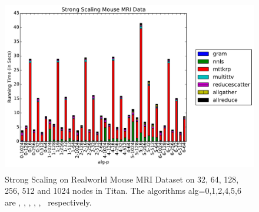 \begin{figure}
	\includegraphics[width=\textwidth, height=3in]{data/plots/ssrw_mouse.pdf}
	\caption {Strong Scaling on Realworld Mouse MRI Dataset on 32, 64, 128, 256, 512 and 1024 nodes in Titan. The algorithms alg=0,1,2,4,5,6 are \MU, \HALS, \BPP, \ADMM, \Nestrov, \CPALS\ respectively.}
	\label{fig:synstrongscaling}
\end{figure}

